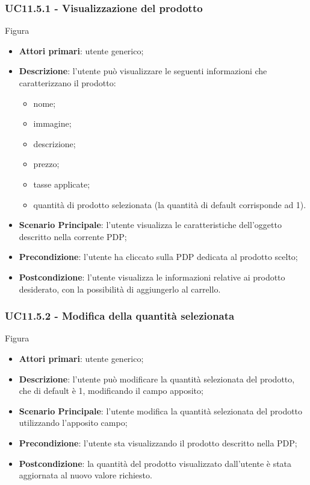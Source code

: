 \subsubsection{UC11.5.1 - Visualizzazione del prodotto}
Figura \\
\begin{itemize}
\item \textbf{Attori primari}: utente generico;
\item \textbf{Descrizione}: l'utente può visualizzare le seguenti informazioni che caratterizzano il prodotto:
\begin{itemize}
\item nome;
\item immagine;
\item descrizione;
\item prezzo;
\item tasse applicate;
\item quantità di prodotto selezionata (la quantità di default corrisponde ad 1).
\end{itemize}
\item \textbf{Scenario Principale}: l'utente visualizza le caratteristiche dell'oggetto descritto nella corrente PDP;
\item \textbf{Precondizione}: l'utente ha cliccato sulla PDP dedicata al prodotto scelto;
\item \textbf{Postcondizione}: l'utente visualizza le informazioni relative ai prodotto desiderato, con la possibilità di aggiungerlo al carrello.
\end{itemize}
\subsubsection{UC11.5.2 - Modifica della quantità selezionata}
Figura \\
\begin{itemize}
\item \textbf{Attori primari}: utente generico;
\item \textbf{Descrizione}: l'utente può modificare la quantità selezionata del prodotto, che di default è 1, modificando il campo apposito;
\item \textbf{Scenario Principale}: l'utente modifica la quantità selezionata del prodotto utilizzando l'apposito campo;
\item \textbf{Precondizione}: l'utente sta visualizzando il prodotto descritto nella PDP;
\item \textbf{Postcondizione}: la quantità del prodotto visualizzato dall'utente è stata aggiornata al nuovo valore richiesto.
\end{itemize}
